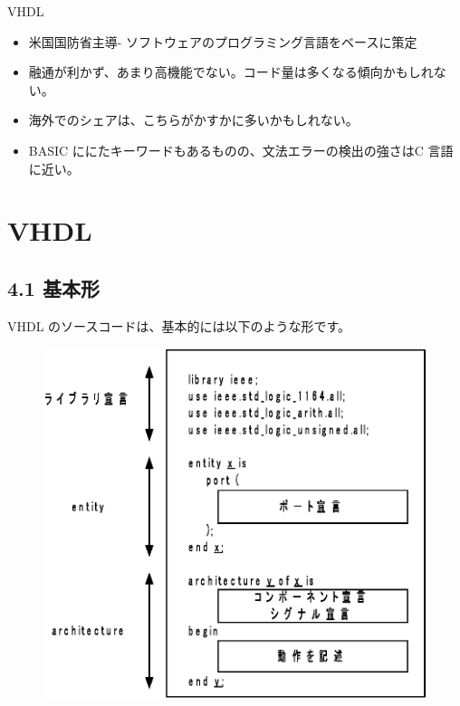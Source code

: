 \documentclass[letterpaper,10pt,dvipdfmx]{sphinxmanual}
\begin{document}
VHDL
\begin{itemize}
\item {} 
米国国防省主導- ソフトウェアのプログラミング言語をベースに策定

\item {} 
融通が利かず、あまり高機能でない。コード量は多くなる傾向かもしれない。

\item {} 
海外でのシェアは、こちらがかすかに多いかもしれない。

\item {} 
BASIC ににたキーワードもあるものの、文法エラーの検出の強さはC 言語に近い。

\end{itemize}


\chapter{VHDL}
\label{04_vhdl::doc}\label{04_vhdl:vhdl}

\section{4.1 基本形}
\label{04_vhdl:id1}
VHDL のソースコードは、基本的には以下のような形です。
\begin{figure}[htbp]
\centering

\includegraphics{figure01.eps}
\end{figure}
\end{document}
